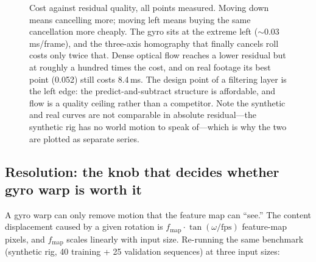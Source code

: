 \documentclass[12pt,a4paper]{article}
\begin{document}
\begin{figure}[htbp]
  \caption{Cost against residual quality, all points measured. Moving down means cancelling more; moving left means buying the same cancellation more cheaply. The gyro sits at the extreme left (${\sim}0.03$\,ms/frame), and the three-axis homography that finally cancels roll costs only twice that. Dense optical flow reaches a lower residual but at roughly a hundred times the cost, and on real footage its best point (0.052) still costs 8.4\,ms. The design point of a filtering layer is the left edge: the predict-and-subtract structure is affordable, and flow is a quality ceiling rather than a competitor. Note the synthetic and real curves are not comparable in absolute residual---the synthetic rig has no world motion to speak of---which is why the two are plotted as separate series.}
  \label{fig:cost}
\end{figure}

\subsection{Resolution: the knob that decides whether gyro warp is worth it}
\label{sec:resolution}

A gyro warp can only remove motion that the feature map can ``see.'' The content displacement caused by a given rotation is $f_{\mathrm{map}} \cdot \tan(\omega / \mathrm{fps})$ feature-map pixels, and $f_{\mathrm{map}}$ scales linearly with input size. Re-running the same benchmark (synthetic rig, 40 training + 25 validation sequences) at three input sizes:
\end{document}
